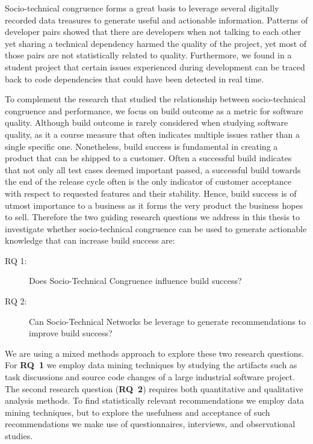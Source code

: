 Socio-technical congruence forms a great basis to leverage several digitally recorded data treasures to generate useful and actionable information.
Patterns of developer pairs showed that there are developers when not talking to each other yet sharing a technical dependency harmed the quality of the project, yet most of those pairs are not statistically related to quality.
Furthermore, we found in a student project that certain issues experienced during development can be traced back to code dependencies that could have been detected in real time.

To complement the research that studied the relationship between socio-technical congruence and performance, we focus on build outcome as a metric for software quality.
Although build outcome is rarely considered when studying software quality, as it a course measure that often indicates multiple issues rather than a single specific one.
Nonetheless,  build success is fundamental in creating a product that can be shipped to a customer.
Often a successful build indicates that not only all test cases deemed important passed, a successful build towards the end of the release cycle often is the only indicator of customer acceptance with respect to requested features and their stability.
Hence, build success is of utmost importance to a business as it forms the very product the business hopes to sell.
Therefore the two guiding research questions we address in this thesis to investigate whether socio-technical congruence can be used to generate actionable knowledge that can increase build success are:
\begin{description}
\item[RQ 1:] Does Socio-Technical Congruence influence build success?
\item[RQ 2:] Can Socio-Technical Networks be leverage to generate recommendations to improve build success?
\end{description}

We are using a mixed methods approach to explore these two research questions.
For \textbf{RQ~1} we employ data mining techniques by studying the artifacts such as task discussions and source code changes of a large industrial software project.
The second research question (\textbf{RQ~2}) requires both quantitative and qualitative analysis methods.
To find statistically relevant recommendations we employ data mining techniques, but to explore the usefulness and acceptance of such recommendations we make use of questionnaires, interviews, and observational studies.


